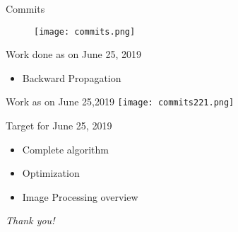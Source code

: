 \documentclass{beamer}
\begin{document}
\begin{frame}{Commits}
    \begin{figure}
        \centering
        \texttt{[image: commits.png]}
    \end{figure}
\end{frame}

\begin{frame}{Work done as on June 25, 2019}
    \begin{itemize}
        \item  Backward Propagation
       
    \end{itemize}
\end{frame}

\begin{frame}{Work as on June 25,2019}
\texttt{[image: commits221.png]}
    
\end{frame}


\begin{frame}{Target for June 25, 2019}
\begin{itemize}
\item Complete algorithm
    \item Optimization
    \item Image Processing overview
\end{itemize}
    
\end{frame}

        
\begin{frame}{}
  \centering \Large
  \color{blue}
  \emph{Thank you!}
\end{frame}
\end{document}
